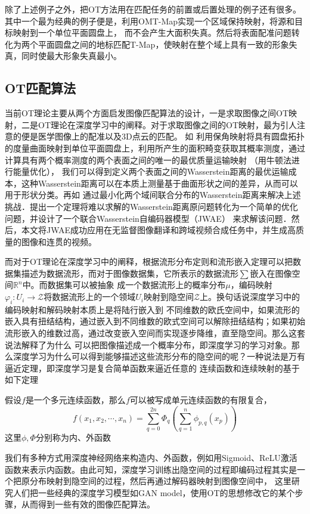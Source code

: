 除了上述例子之外，把OT方法用在匹配任务的前置或后置处理的例子还有很多。其中一个最为经典的例子便是\cite{ma2017robust}，利用OMT-Map实现一个区域保持映射，将源和目标映射到一个单位平面圆盘上，
而不会产生大面积失真。然后将表面配准问题转化为两个平面圆盘之间的地标匹配T-Map，使映射在整个域上具有一致的形象失真，同时使最大形象失真最小。

\subsection{OT匹配算法}

当前OT理论主要从两个方面启发图像匹配算法的设计，一是求取图像之间OT映射，二是OT理论在深度学习中的阐释。对于求取图像之间的OT映射，最为引人注意的便是医学图像上的配准以及3D点云的匹配。
如\cite{su2015optimal} 利用保角映射将具有圆盘拓扑的度量曲面映射到单位平面圆盘上，利用所产生的面积畸变获取其概率测度，通过计算具有两个概率测度的两个表面之间的唯一的最优质量运输映射
（用牛顿法进行能量优化）， 我们可以得到定义两个表面之间的Wasserstein距离的最优运输成本，这种Wasserstein距离可以在本质上测量基于曲面形状之间的差异，从而可以用于形状分类。再如\cite{RN1}
通过最小化两个域间联合分布的Wasserstein距离来解决上述挑战．提出一个定理将难以求解的Wasserstein距离原问题转化为一个简单的优化问题，并设计了一个联合Wasserstein自编码器模型（JWAE）
来求解该问题．然后，本文将JWAE成功应用在无监督图像翻译和跨域视频合成任务中，并生成高质量的图像和连贯的视频。

而对于OT理论在深度学习中的阐释，根据流形分布定则和流形嵌入定理\cite{kuratowski2014topology}可以把数据集描述为数据流形，而对于图像数据集，它所表示的数据流形$\sum$嵌入在图像空间$\mathbb{R}^n$中。而数据集可以被抽象
成一个数据流形上的概率分布$\mu$，编码映射$\varphi_i : U_i \to \mathcal{Z}$将数据流形上的一个领域$U_i$映射到隐空间$\mathcal{Z}$上。换句话说深度学习中的编码映射和解码映射本质上是将陆行嵌入到
不同维数的欧氏空间中，如果流形的嵌入具有扭结结构，通过嵌入到不同维数的欧式空间可以解除扭结结构；如果初始流形嵌入的维数过高，通过改变嵌入空间而实现逐步降维，直至隐空间。那么这套说法解释了为什么
可以把图像描述成一个概率分布，即深度学习的学习对象。那么深度学习为什么可以得到能够描述这些流形分布的隐空间的呢？一种说法是万有逼近定理\cite{rn2}，即深度学习是复合简单函数来逼近任意的
连续函数和连续映射的基于如下定理
\begin{theorem}\label{theorem:Kolmogorov-Arnold}
    假设$f$是一个多元连续函数，那么$f$可以被写成单元连续函数的有限复合，
    \begin{equation*}\label{function:Kolmogorov-Arnold}
        f(x_1,x_2, \cdots, x_n) = \sum_{q=0}^{2n} \Phi _q \left ( \sum _{q=1}^n \phi_{p,q}(x_p)  \right ) 
    \end{equation*}
    这里$\phi , \Phi$分别称为内、外函数
\end{theorem}
我们有多种方式用深度神经网络来构造内、外函数，例如用Sigmoid、ReLU激活函数来表示内函数。由此可知，深度学习训练出隐空间的过程即编码过程其实是一个把原分布映射到隐空间的过程，然后再通过解码器映射到图像空间中，
这里研究人们把一些经典的深度学习模型如GAN model，使用OT的思想修改它的某个步骤，从而得到一些有效的图像匹配算法。


